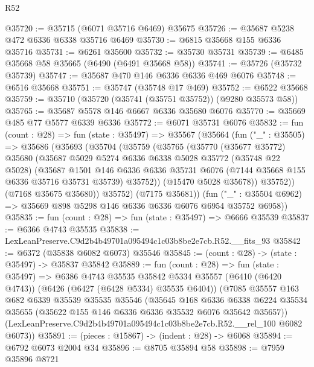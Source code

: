 \begin{lexlean}{R52}
\begin{coremodule}
@35720 := @35715 (@6071 @35716 @6469) @35675
@35726 := @35687 @5238 @472 @6336 @6338 @35716 @6469
@35730 := @6815 @35668 @155 @6336 @35716
@35731 := @6261 @35600
@35732 := @35730 @35731
@35739 := @6485 @35668 @58 @35665 (@6490 (@6491 @35668 @58))
@35741 := @35726 (@35732 @35739)
@35747 := @35687 @470 @146 @6336 @6336 @469 @6076
@35748 := @6516 @35668
@35751 := @35747 (@35748 @17 @469)
@35752 := @6522 @35668
@35759 := @35710 (@35720 (@35741 (@35751 @35752)) (@9280 @35573 @58))
@35765 := @35687 @5578 @146 @6667 @6336 @35680 @6076
@35770 := @35669 @485 @77 @5577 @6339 @6336
@35772 := @6071 @35731 @6076
@35832 := fun (count : @28) =>
  fun (state : @35497) =>
  @35567
    (@35664
      (fun ("_" : @35505) =>
      @35686
        (@35693
          (@35704
            (@35759
              (@35765
                (@35770
                  (@35677 @35772)
                  @35680
                  (@35687
                    @5029
                    @5274
                    @6336
                    @6338
                    @5028
                    @35772
                    (@35748 @22 @5028)
                    (@35687
                      @1501
                      @146
                      @6336
                      @6336
                      @35731
                      @6076
                      (@7144 @35668 @155 @6336 @35716 @35731 @35739)
                      @35752))
                  (@15470 @5028 @35678))
                @35752))
            (@7168 @35675 @35680))
          @35752)
        (@7175 @35681))
      (fun ("_" : @35504 @6962) => @35669 @898 @5298 @146 @6336 @6336 @6076 @6954 @35752 @6958))
@35835 := fun (count : @28) => fun (state : @35497) => @6666 @35539
@35837 := @6366 @4743 @35535
@35838 := LexLeanPreserve.C9d2b4b49701a095494c1c03b8be2e7cb.R52.__fits_93
@35842 := @6372 (@35838 @6082 @6073) @35546
@35845 := (count : @28) -> (state : @35497) -> @35837 @35842
@35889 := fun (count : @28) =>
  fun (state : @35497) =>
  @6386
    @4743
    @35535
    @35842
    @5334
    @35557
    (@6410 (@6420 @4743))
    (@6426 (@6427 (@6428 @5334) @35535 @6404))
    (@7085
      @35557
      @163
      @682
      @6339
      @35539
      @35535
      @35546
      (@35645
        @168
        @6336
        @6338
        @6224
        @35534
        @35655
        (@35622 @155 @146 @6336 @6336 @35532 @6076 @35642 @35657))
      (LexLeanPreserve.C9d2b4b49701a095494c1c03b8be2e7cb.R52.__rel_100 @6082 @6073))
@35891 := (pieces : @15867) -> (indent : @28) -> @6068
@35894 := @6792 @6073 @2004 @34
@35896 := @8705 @35894 @58
@35898 := @7959 @35896 @8721

\end{coremodule}
\end{lexlean}
